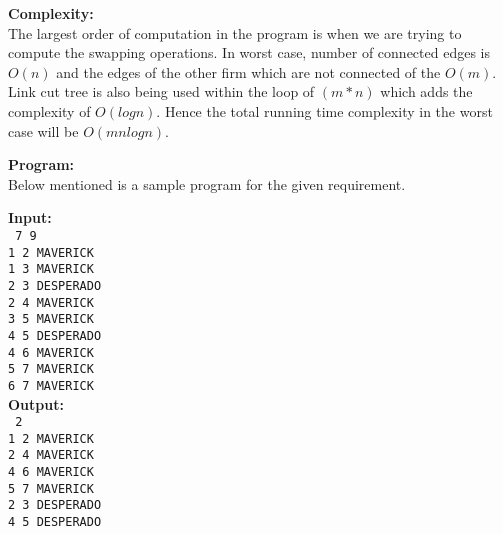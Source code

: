 \documentclass[12pt]{article}
\begin{document}
\begin{enumerate}
\textbf{Complexity:}\\The largest order of computation in the program is when we are trying to compute the swapping operations. In worst case, number of connected edges is  $O(n)$ and the edges of the other firm which are not connected of the  $O(m)$. Link cut tree is also being used within the loop of $(m * n)$ which adds the complexity of  $O(logn)$. Hence the total running time complexity in the worst case will be $O (mnlog n)$. 


\textbf{Program:}\\ Below mentioned is a sample program for the given requirement.\\



\textbf{Input:}\\
\texttt{
	7 9\\
	1 2 MAVERICK\\
	1 3 MAVERICK\\
	2 3 DESPERADO\\
	2 4 MAVERICK\\
	3 5 MAVERICK\\
	4 5 DESPERADO\\
	4 6 MAVERICK\\
	5 7 MAVERICK\\
	6 7 MAVERICK\\
}
\textbf{Output:}\\
\texttt{
	2\\
	1 2 MAVERICK\\
	2 4 MAVERICK\\
	4 6 MAVERICK\\
	5 7 MAVERICK\\
	2 3 DESPERADO\\
	4 5 DESPERADO\\
}
\end{enumerate}
\end{document}
